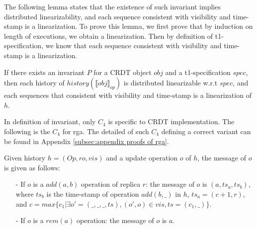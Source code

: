 The following lemma states that the existence of such invariant implies distributed linearizability, and each sequence consistent with visibility and time-stamp is a linearization. To prove this lemma, we first prove that by induction on length of executions, we obtain a linearization. Then by definition of t1-specification, we know that each sequence consistent with visibility and time-stamp is a linearization. 

\begin{lemma}
\label{lemma:invariant of operation-based CRDT implies distributed linearizability for t1-specification}
If there exists an invariant $P$ for a CRDT object $\mathit{obj}$ and a t1-specification $\mathit{spec}$, then each history of $\mathit{history}(\llbracket \mathit{obj} \rrbracket_{\mathit{op}})$ is distributed linearizable w.r.t $\mathit{spec}$, and each sequences that consistent with visibility and time-stamp is a linearization of $h$. 
\end{lemma} 


In definition of invariant, only $C_4$ is specific to CRDT implementation. The following is the $C_4$ for rga. The detailed of such $C_4$ defining a correct variant can be found in Appendix \ref{subsec:appendix proofs of rga}. 

\begin{example}
\label{example:c4 for rga}
Given history $h = (\mathit{Op},\mathit{ro},\mathit{vis})$ and a update operation $o$ of $h$, the message of $o$ is given as follows:

\begin{itemize}
\setlength{\itemsep}{0.5pt}
\item[-] If $o$ is a $\mathit{add}(a,b)$ operation of replica $r$: the message of $o$ is $(a,\mathit{ts}_a,\mathit{ts}_b)$, where $\mathit{ts}_b$ is the time-stamp of operation $\mathit{add}(b,\_)$ in $h$, $\mathit{ts}_a = (c+1, r)$, and $c = \mathit{max}\{ c_1 \vert \exists o' = (\_,\_,\_,\mathit{ts}), (o',o) \in \mathit{vis}, \mathit{ts} = (c_1,\_) \}$. 

\item[-] If $o$ is a $\mathit{rem}(a)$ operation: the message of $o$ is $a$. 
\end{itemize} 
\end{example} 















